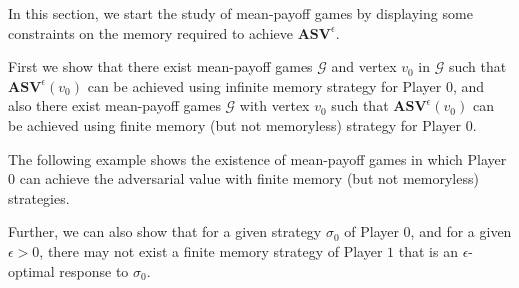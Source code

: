 In this section, we start the study of mean-payoff games by displaying some constraints on the memory required to achieve $\mathbf{ASV}^{\epsilon}$.

First we show that there exist mean-payoff games $\mathcal{G}$ and vertex $v_0$ in $\mathcal{G}$ such that $\mathbf{ASV}^{\epsilon}(v_0)$ can be achieved using infinite memory strategy for Player $0$, and also there exist mean-payoff games $\mathcal{G}$ with vertex $v_0$ such that $\mathbf{ASV}^{\epsilon}(v_0)$ can be achieved using finite memory (but not memoryless) strategy for Player $0$.



The following example shows the existence of mean-payoff games in which Player $0$ can achieve the adversarial value with finite memory (but not memoryless) strategies.



Further, we can also show that for a given strategy $\sigma_0$ of Player $0$, and for a given $\epsilon > 0$, there may not exist a finite memory strategy of Player $1$ that is an $\epsilon$-optimal response to $\sigma_0$.


